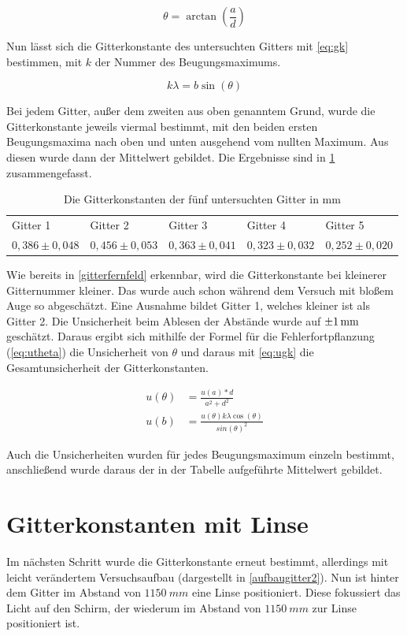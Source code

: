 \begin{equation}
	\theta = \arctan\left(\frac{a}{d}\right)
	\label{eq:sin}
\end{equation}

Nun lässt sich die Gitterkonstante des untersuchten Gitters mit \cref{eq:gk} bestimmen, mit $k$ der Nummer des Beugungsmaximums.

\begin{equation}
	k\lambda = b \sin(\theta)
	\label{eq:gk}
\end{equation}

Bei jedem Gitter, außer dem zweiten aus oben genanntem Grund, wurde die Gitterkonstante jeweils viermal bestimmt, mit den beiden ersten Beugungsmaxima nach oben und unten ausgehend vom nullten Maximum. Aus diesen wurde dann der Mittelwert gebildet. Die Ergebnisse sind in \cref{tab} zusammengefasst.

\begin{table}[h]
	\caption{Die Gitterkonstanten der fünf untersuchten Gitter in mm}
\begin{tabular}{lllll}
	Gitter 1 & Gitter 2& Gitter 3& Gitter 4& Gitter 5\\
	 $0,386\pm0,048$ & $0,456\pm0,053$ & $0,363\pm0,041$ & $0,323\pm0,032$ & $0,252\pm0,020$
\end{tabular}
\label{tab}
\end{table}

Wie bereits in \cref{gitterfernfeld} erkennbar, wird die Gitterkonstante bei kleinerer Gitternummer kleiner. Das wurde auch schon während dem Versuch mit bloßem Auge so abgeschätzt. Eine Ausnahme bildet Gitter 1, welches kleiner ist als Gitter 2.
Die Unsicherheit beim Ablesen der Abstände wurde auf $\SI{\pm1}{mm}$ geschätzt. Daraus ergibt sich mithilfe der Formel für die Fehlerfortpflanzung (\cref{eq:utheta}) die Unsicherheit von $\theta$ und daraus mit \cref{eq:ugk} die Gesamtunsicherheit der Gitterkonstanten.

\begin{align}
u(\theta) &= \frac{u(a)*d}{a^2 +d^2}
\label{eq:utheta}\\
u(b) &= \frac{u(\theta) k \lambda \cos(\theta)}{sin(\theta)^2}
\label{eq:ugk}
\end{align}

Auch die Unsicherheiten wurden für jedes Beugungsmaximum einzeln bestimmt, anschließend wurde daraus der in der Tabelle aufgeführte Mittelwert gebildet.

\section{Gitterkonstanten mit Linse}
Im nächsten Schritt wurde die Gitterkonstante erneut bestimmt, allerdings mit leicht verändertem Versuchsaufbau (dargestellt in \cref{aufbaugitter2}). Nun ist hinter dem Gitter im Abstand von $\SI{1150}{mm}$ eine Linse positioniert. Diese fokussiert das Licht auf den Schirm, der wiederum im Abstand von $\SI{1150}{mm}$ zur Linse positioniert ist.


